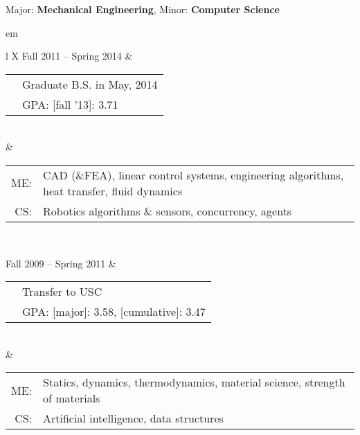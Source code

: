 

{\centering \large{Major: \textbf{Mechanical Engineering}, Minor: \textbf{Computer Science}} \par }

	
{ em
\begin{tabu}{ L{\tabularIndent} X } \hhline{==}
	Fall 2011 -- Spring 2014 & 
	\begin{tabular}{ l | l }
		\multirow{2}{*}{\mysubsection{University of Southern California}} & Graduate B.S. in May, 2014 \\
																		  & GPA: [fall '13]: 3.71 \\ \cline{1-1}
	\end{tabular}
	\\
	&
	\setlength{\tabcolsep}{0.0 em}
	\begin{tabular}{ r l }
		ME: \quad &
		CAD (\&FEA), linear control systems, engineering algorithms, heat transfer, fluid dynamics 
		\\
		CS: \quad &
		Robotics algorithms \& sensors, concurrency, agents \\
	\end{tabular}
	
\\ \hhline{==}

	Fall 2009 -- Spring 2011 & 
	\begin{tabular}{ l | l }
		\multirow{2}{*}{\mysubsection{University of Massachusetts, Amherst}} & Transfer to USC \\
																		  & GPA: [major]: 3.58, [cumulative]: 3.47 \\ \cline{1-1}
	\end{tabular}
	\\
	&
	\setlength{\tabcolsep}{0 em}
	\begin{tabular}{ r l }
		ME: \quad &
		Statics, dynamics, thermodynamics, material science, strength of materials
		\\
		CS: \quad &
		Artificial intelligence, data structures \\
	\end{tabular}
\end{tabu}}